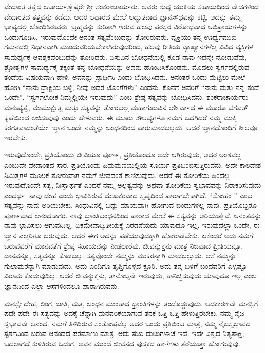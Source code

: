 ವೇದಾಂತ ತತ್ವದ ಆಚಾರ್ಯಶ್ರೇಷ್ಠರೇ ಶ‍್ರೀ ಶಂಕರಾಚಾರ್ಯರು. ಅವರು ಶುದ್ದ ಯುಕ್ತಿಯ ಸಹಾಯದಿಂದ ವೇದಗಳಿಂದ ವೇದಾಂತದ ತತ್ತ್ವವನ್ನು ಕಡೆದು, ಅದರ ಆಧಾರದ ಮೇಲೆ ಅದ್ಭುತವಾದ ಜ್ಞಾನಸೌಧವನ್ನು ಕಟ್ಟಿ, ಅದನ್ನು ತಮ್ಮ ಭಾಷ್ಯದಲ್ಲಿ ಬೋಧಿಸಿರುವರು. ಬ್ರಹ್ಮವನ್ನು ಕುರಿತಾಗಿ ಇರುವ ಹಲವು ಪರಸ್ಪರ ವಿರೋಧವಾದ ಅಭಿಪ್ರಾಯಗಳನ್ನು ಒಂದುಗೂಡಿಸಿ, ಇರುವುದೊಂದೇ ಅನಂತ ಸತ್ಯವೆಂಬುದನ್ನು ತೋರಿರುವರು. ವ್ಯಕ್ತಿಯು ತನ್ನ ಊರ್ಧ್ವಮುಖ ಗಮನದಲ್ಲಿ ನಿಧಾನವಾಗಿ ಮುಂದುವರಿಯಬೇಕಾಗಿರುವುದರಿಂದ, ಹಲವು ರೀತಿಯ ವ್ಯಾಖ್ಯಾನಗಳೆಲ್ಲ ವಿವಿಧ ವ್ಯಕ್ತಿಗಳ ಸಾಮರ್ಥ್ಯಕ್ಕೆ ಆವಶ್ಯಕವೆಂಬುದನ್ನು ತೋರಿದರು. ಏಸುವಿನ ಬೋಧನೆಯಲ್ಲಿ ಕೂಡ ನಾವು ಇದನ್ನೇ ನೋಡುವೆವು, ಶ್ರೋತೃಗಳ ಸಾಮರ್ಥ್ಯಕ್ಕೆ ತಕ್ಕಂತೆ ತನ್ನ ಬೋಧನೆಯನ್ನು ಅವನು ಹೊಂದಿಸಿಕೊಂಡನು. ಮೊದಲು ಸ್ವರ್ಗದಲ್ಲಿರುವ ತಂದೆಯ ವಿಷಯವಾಗಿ ಹೇಳಿ, ಅವನನ್ನು ಪ್ರಾರ್ಥಿಸಿ ಎಂದು ಬೋಧಿಸಿದನು. ಅನಂತರ ಒಂದು ಮೆಟ್ಟಿಲು ಮೇಲೆ ಹೋಗಿ “ನಾನು ದ್ರಾಕ್ಷಿಯ ಬಳ್ಳಿ, ನೀವು ಅದರ ಟೊಂಗೆಗಳು” ಎಂದನು. ಕೊನೆಗೆ ಅವರಿಗೆ “ನಾನು ಮತ್ತು ನನ್ನ ತಂದೆ ಒಂದೇ”, “ಸ್ವರ್ಗಲೋಕ ನಿಮ್ಮಲ್ಲಿಯೇ ಇರುವುದು” ಎಂಬ ಶ್ರೇಷ್ಠ ಸತ್ಯವನ್ನು ಬೋಧಿಸಿದನು. ಶಂಕರಾಚಾರ್ಯರು ಮನುಷ್ಯತ್ವ, ಮುಮುಕ್ಷುತ್ವ ಮತ್ತು ಸತ್ಯವನ್ನು ತೋರಬಲ್ಲ ಮಹಾಗುರುವಿನ ಆಶೀರ್ವಾದ ಈ ಮೂರೂ ಭಗವತ್ ಕೃಪೆಯಿಂದ ಲಭಿಸುವುವು ಎಂದು ಹೇಳುವರು. ಈ ಮೂರು ಸೌಲಭ್ಯಗಳೂ ನಮಗೆ ಒದಗಿದರೆ ನಮ್ಮ ಮುಕ್ತಿ ಕರಗತವಾದಂತೆಯೇ. ಜ್ಞಾನ ಒಂದೇ ನಮ್ಮನ್ನು ಬಂಧನದಿಂದ ಪಾರುಮಾಡಬಲ್ಲದು. ಆದರೆ ಜ್ಞಾನದೊಂದಿಗೆ ಶೀಲವೂ ಇರಬೇಕು.

ಇರುವುದೊಂದೇ, ಪ್ರತಿಯೊಂದು ಜೀವಿಯೂ ಪೂರ್ಣ, ಪ್ರತಿಯೊಂದೂ ಅದೇ ಆಗಿರುವುದು, ಅದರ ಅಂಶವಲ್ಲ ಎಂಬುದೇ ವೇದಾಂತದ ಸಾರ. ಪ್ರತಿಯೊಂದು ಹಿಮಮಣಿಯಲ್ಲಿಯ ಸೂರ್ಯ ಪ್ರತಿಬಿಂಬಿಸುತ್ತಿರುವನು. ಅದೇ ಕಾಲದೇಶ ನಿಮಿತ್ತಗಳ ಮೂಲಕ ತೋರುವಾಗ ನಮಗೆ ಜೀವದಂತೆ ಕಾಣಿಸುವುದು. ಆದರೆ ಈ ತೋರಿಕೆಯ ಹಿಂದೆಲ್ಲ ಇರುವುದೊಂದೇ ಸತ್ಯ, ನಿಃಸ್ವಾರ್ಥತೆ ಎಂದರೆ ನಮ್ಮ ಅಲ್ಪತ್ವವನ್ನು ಅಥವಾ ತೋರಿಕೆಯ ಸ್ವಭಾವವನ್ನು ನಿರಾಕರಿಸುವುದು ಎಂದರ್ಥ. ನಾವು ದೇಹ ಎಂದು ಭಾವಿಸಿರುವ ದುಃಖಕರವಾದ ಸ್ವಪ್ನದಿಂದ ಪಾರಾಗಬೇಕಾಗಿದೆ. “ಸೋಹಂ '' ಎಂಬ ಸತ್ಯವನ್ನು ನಾವು ಅರಿಯಬೇಕು. ಸಿಂಧುವಿನಲ್ಲಿ ಬಿದ್ದು ಮಾಯವಾಗಿ ಹೋಗುವ ಬಿಂದುಗಳಲ್ಲ ನಾವು. ಪ್ರತಿಯೊಬ್ಬರೂ ಪೂರ್ಣವಾದ ಆನಂದಸಾಗರ. ನಾವು ಭ್ರಾಂತಿಬಂಧನದಿಂದ ಪಾರಾದ ಮೇಲೆ ಈ ಸತ್ಯವನ್ನು ಅರಿಯುತ್ತೇವೆ. ಅನಂತವನ್ನು ನಾವು ಭಾವಿಸಲು ಆಗುವುದಿಲ್ಲ. ಏಕಮೇವಾದ್ವಿತೀಯಕ್ಕೆ ಎರಡನೆಯದು ಯಾವುದೂ ಇಲ್ಲ. ಇರುವುದೆಲ್ಲಾ ಒಂದೇ, ಈ ಜ್ಞಾನ ಎಲ್ಲರಿಗೂ ಬರುವುದು. ಆದರೆ ಈಗ ಅದನ್ನು ಪಡೆಯುವುದಕ್ಕಾಗಿ ಹೋರಾಡಬೇಕು. ಏಕೆಂದರೆ ಅದು ನಮಗೆ ಬರುವವರೆಗೆ ಮಾನವತೆಗೆ ಶ್ರೇಷ್ಠ ಸಹಾಯವನ್ನು ನೀಡಲಾರೆವು. ಜೀವನ್ಮುಕ್ತನು ಮಾತ್ರ ನಿಜವಾದ ಪ್ರೀತಿಯನ್ನೂ, ದಾನವನ್ನೂ, ಸತ್ಯವನ್ನೂ ಕೊಡಬಲ್ಲ. ಸತ್ಯವೊಂದೇ ನಮ್ಮನ್ನು ಮುಕ್ತರನ್ನಾಗಿ ಮಾಡಬಲ್ಲುದು. ಆಸೆ ನಮ್ಮನ್ನು ಗುಲಾಮರನ್ನಾಗಿ ಮಾಡುವುದು, ಅದು ಎಂದಿಗೂ ತೃಪ್ತಿಗೊಳ್ಳದ ಕ್ರೂರಿ. ಅದು ತನ್ನ ಬಳಿಗೆ ಬಂದವರಿಗೆ ಎಳ್ಳಷ್ಟೂ ವಿರಾಮ ಕೊಡುವುದಿಲ್ಲ. ಆದರೆ ಜೀವನ್ಮುಕ್ತನು, ತಾನೊಬ್ಬನೇ ಇರುವುದು, ತಾನಿಚ್ಚಿಸುವುದು ಯಾವುದೂ ಇಲ್ಲ ಎಂಬ ಜ್ಞಾನದಿಂದ ಎಲ್ಲಾ ಆಸೆಗಳಿಂದಲೂ ಪಾರಾಗಿರುವನು.

ಮನಸ್ಸೇ ದೇಹ, ಲಿಂಗ, ಜಾತಿ, ಮತ, ಬಂಧನ ಮುಂತಾದ ಭ್ರಾಂತಿಗಳನ್ನು ತಂದೊಡ್ಡುವುದು. ಆದಕಾರಣವೇ ಮನಸ್ಸಿಗೆ ಪದೇ ಪದೇ ಈ ಸತ್ಯವನ್ನು ಅದಕ್ಕೆ ಚೆನ್ನಾಗಿ ಮನವರಿಕೆಯಾಗುವ ತನಕ ಒತ್ತಿ ಒತ್ತಿ ಹೇಳುತ್ತಿರಬೇಕು. ನಮ್ಮ ನೈಜ ಸ್ವಭಾವವೇ ಆನಂದ. ನಮಗೆ ತಿಳಿದಿರುವ ಸಂತೋಷವೆಲ್ಲ ಅದರ ಒಂದು ಪ್ರತಿಬಿಂಬ ಮಾತ್ರ, ನಮ್ಮ ನೈಜಸ್ವಭಾವದ ಸ್ಪರ್ಶದಿಂದ ಬರುವ ಆನಂದದ ಪರಮಾಣು ಮಾತ್ರ. ಅದು ಸುಖ ದುಃಖಗಳಾಚೆ ಇದೆ. ಇದೇ ವಿಶ್ವದ ನಿತ್ಯಸಾಕ್ಷಿ; ಬದಲಾಗದೆ ಕುಳಿತಿರುವ ಓದುಗ, ಅವನ ಮುಂದೆ ಜೀವನದ ಪುಸ್ತಕದ ಹಾಳೆಗಳು ತೆರೆಯುತ್ತಾ ಹೋಗುವುವು.

